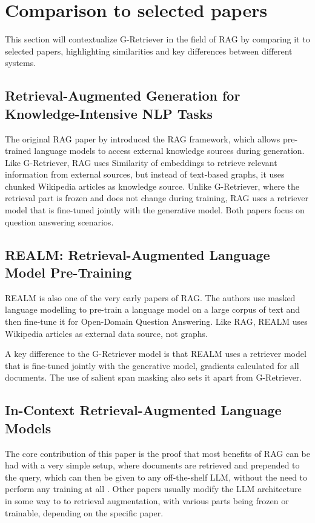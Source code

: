 \section{Comparison to selected papers}

This section will contextualize G-Retriever in the field of RAG by comparing it to selected papers, highlighting similarities and key differences between different systems.

\subsection{Retrieval-Augmented Generation for    Knowledge-Intensive NLP Tasks}

The original RAG paper by \citet{rag} introduced the RAG framework, which allows pre-trained language models to access external knowledge sources during generation.
Like G-Retriever, RAG uses Similarity of embeddings to retrieve relevant information from external sources, but instead of text-based graphs, it uses chunked Wikipedia articles as knowledge source.
Unlike G-Retriever, where the retrieval part is frozen and does not change during training, RAG uses a retriever model that is fine-tuned jointly with the generative model.
Both papers focus on question answering scenarios.

\subsection{REALM: Retrieval-Augmented Language Model Pre-Training}

REALM \cite{realm} is also one of the very early papers of RAG.
The authors use masked language modelling to pre-train a language model on a large corpus of text and then fine-tune it for Open-Domain Question Answering.
Like RAG, REALM uses Wikipedia articles as external data source, not graphs.

A key difference to the G-Retriever model is that REALM uses a retriever model that is fine-tuned jointly with the generative model, gradients calculated for all documents.
The use of salient span masking also sets it apart from G-Retriever.

\subsection{In-Context Retrieval-Augmented Language Models}

The core contribution of this paper is the proof that most benefits of RAG can be had with a very simple setup, where documents are retrieved and prepended to the query, which can then be given to any off-the-shelf LLM, without the need to perform any training at all \cite{in-context}.
Other papers usually modify the LLM architecture in some way to to retrieval augmentation, with various parts being frozen or trainable, depending on the specific paper.

